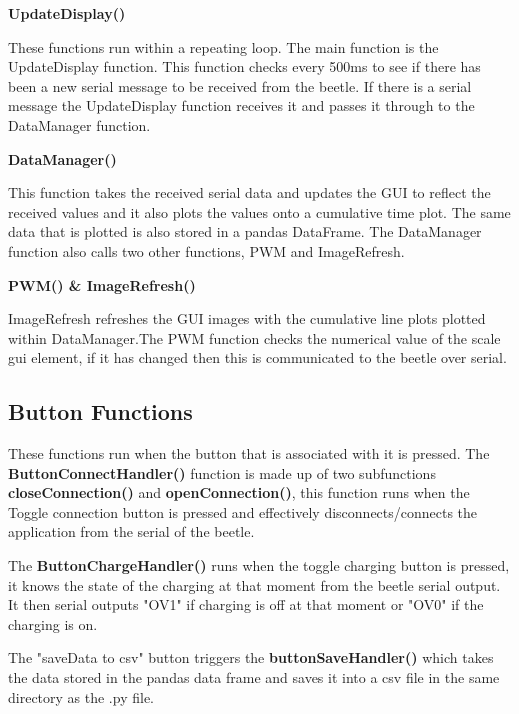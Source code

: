 \begin{flushleft}
\textbf{UpdateDisplay()}
	\end{flushleft}


These functions run within a repeating loop. The main function is the UpdateDisplay function. This function checks every 500ms to see if there has been a new serial message to be received from the beetle. If there is a serial message the UpdateDisplay function receives it and passes it through to the DataManager function. 


\begin{flushleft}
 \textbf{DataManager()}
\end{flushleft}

This function takes the received serial data and updates the GUI to reflect the received values and it also plots the values onto a cumulative time plot. The same data that is plotted is also stored in a pandas DataFrame. The DataManager function also calls two other functions, PWM and ImageRefresh.

\begin{flushleft}
	\textbf{PWM() \& ImageRefresh()}
	\end{flushleft}


ImageRefresh refreshes the GUI images with the cumulative line plots plotted within DataManager.The PWM function checks the numerical value of the scale gui element, if it has changed then this is communicated to the beetle over serial.

\subsection{Button Functions}
These functions run when the button that is associated with it is pressed. The \textbf{ButtonConnectHandler()} function is made up of two subfunctions \textbf{closeConnection()} and \textbf{openConnection()}, this function runs when the Toggle connection button is pressed and effectively disconnects/connects the application from the serial of the beetle.

The \textbf{ButtonChargeHandler()} runs when the toggle charging button is pressed, it knows the state of the charging at that moment from the beetle serial output. It then serial outputs "OV1" if charging is off at that moment or "OV0" if the charging is on.

The "saveData to csv" button triggers the \textbf{buttonSaveHandler()} which takes the data stored in the pandas data frame and saves it into a csv file in the same directory as the .py file.




